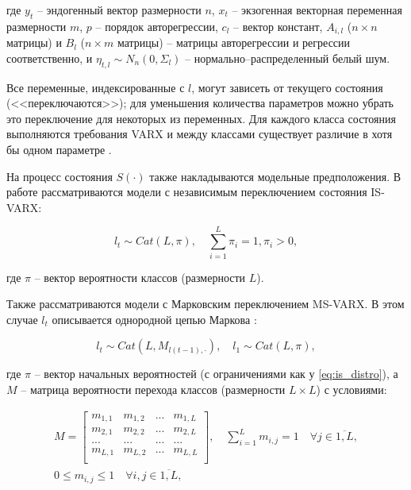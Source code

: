 \documentclass[a4paper,14pt]{extreport}
\begin{document}
\noindent
где 
$y_t$ -- эндогенный вектор размерности $n$, 
$x_{t}$ -- экзогенная векторная переменная размерности $m$,
$p$ -- порядок авторегрессии, 
$c_{l}$ -- вектор констант,
$A_{i,l}$ ($n \times n$ матрицы) и $B_{l}$ ($n \times m$ матрицы) -- матрицы авторегрессии и регрессии соответственно,
и $\eta_{t, l} \sim N_n(0, \Sigma_{l}) $ -- нормально–распределенный белый шум.

Все переменные, индексированные с $l$, могут зависеть от текущего состояния (<<переключаются>>); для уменьшения количества параметров можно убрать это переключение для некоторых из переменных. Для каждого класса состояния выполняются требования VARX и между классами существует различие в хотя бы одном параметре \cite{malNovopMSVARX}.

На процесс состояния $S(\cdot)$ также накладываются модельные предположения. В работе рассматриваются модели с независимым переключением состояния IS-VARX:

\begin{equation}
	l_t \sim \mathit{Cat}(L, \pi), \quad \sum_{i=1}^{L}{\pi_i} = 1, \pi_i > 0 ,
	\label{eq:is_distro}
\end{equation}

\noindent
где $\pi$ -- вектор вероятности классов (размерности $L$).

Также рассматриваются модели с Марковским переключением MS-VARX. 
В этом случае $l_t$ описывается однородной цепью Маркова  \cite{malNovopMSVARX}:

\begin{equation}
	l_t \sim \mathit{Cat}(L, M_{l(t-1), \cdot}),
	\quad 
	l_1 \sim \mathit{Cat}(L, \pi) ,
\end{equation}

\noindent
где $\pi$ -- вектор начальных вероятностей (с ограничениями как у \ref{eq:is_distro}), а $M$ -- матрица вероятности перехода классов (размерности $L \times L$) с условиями:

\begin{equation}
	\begin{multlined}
		M=
		\left[
			{
					\begin{array}{cccc}
						m_{1,1} & m_{1,2} & ... & m_{1,L} \\
						m_{2,1} & m_{2,2} & ... & m_{2,L} \\
						...     & ...     & ... & ...     \\
						m_{L,1} & m_{L,2} & ... & m_{L,L} \\
					\end{array}
				}
			\right]
		, \quad
		\sum_{i=1}^{L} m_{i,j} = 1 \quad \forall j \in \overline{1,L}
		,
		\\
		0 \le m_{i,j} \le 1 \quad \forall i, j \in \overline{1,L},
	\end{multlined}
\end{equation}
\end{document}
